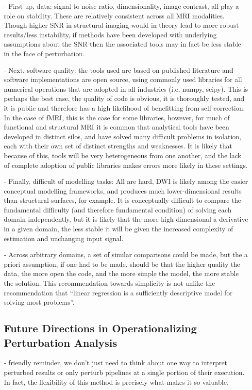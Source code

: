 - First up, data: signal to noise ratio, dimensionality, image contrast, all play a role on stability. These are
relatively consistent across all MRI modalities. Though higher SNR in structural imaging would in theory lead to
more robust results/less instability, if methods have been developed with underlying assumptions about the SNR then
the associated tools may in fact be less stable in the face of perturbation.

- Next, software quality: the tools used are based on published literature and software implementations are open
source, using commonly used libraries for all numerical operations that are adopted in all industries (i.e. numpy,
scipy). This is perhaps the best case, the quality of code is obvious, it is thoroughly tested, and it is public
and therefore has a high likelihood of benefitting from self correction. In the case of fMRI, this is the case for
some libraries, however, for much of functional and structural MRI it is common that analytical tools have been
developed in distinct silos, and have solved many difficult problems in isolation, each with their own set of
distinct strengths and weaknesses. It is likely that because of this, tools will be very heterogeneous from one
another, and the lack of complete adoption of public libraries makes errors more likely in these settings.

- Finally, difficult of modelling tasks: All are hard, DWI is likely among the easier conceptual modelling
frameworks, and produces much lower-dimensional results than structural surfaces, for example. It is conceptually
difficult to compare the fundamental difficulty (and therefore fundamental condition) of solving each domain
independently, but it is likely that the more high-dimensional a derivative in a given domain, the less stable it
will be given the increased complexity of estimation and unchanging input signal.

- Across arbitrary domains, a set of similar comparisons could be made, but the a priori assumption, if one had to
be made, should be that the higher quality the data, the more open the code, and the more simple the model, the
more stable the solution. This recommendation towards simplicity is not unlike the recommendation that ``linear
regression is a sufficiently descriptive model for solving most problems''.

\subsection{Future Directions in Operationalizing Perturbation Analysis}
- friendly reminder, we don't just need to think about one way to interpret perturbed results or only perturb
pipelines at a single portion of their execution. In fact, the flexibility of this method is precisely what makes
it so valuable.

